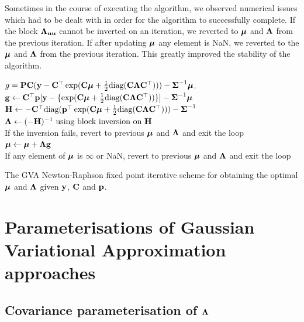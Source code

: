 Sometimes in the course of  executing the algorithm, we observed numerical
issues which had to be dealt with in order for the algorithm to successfully
complete. If the block ${\boldsymbol \Lambda}_{{\bf u} {\bf u}}$ cannot be inverted on an iteration,
we reverted to ${\boldsymbol \mu}$ and ${\boldsymbol \Lambda}$ from the previous iteration. If after
updating ${\boldsymbol \mu}$ any element is NaN, we reverted to the ${\boldsymbol \mu}$ and ${\boldsymbol \Lambda}$
from the previous iteration. This greatly improved the stability of the
algorithm.

\begin{algorithm}
	\begin{algorithmic}
		\REQUIRE $g = {\bf P} {\bf C} ({\bf y} - {\bf C}^\top \exp({\bf C} {\boldsymbol \mu} + \tfrac{1}{2} \text{diag}{({\bf C}{\boldsymbol\Lambda}{\bf C}^\top)})) - {\boldsymbol \Sigma}^{-1} {\boldsymbol \mu}$.
			\STATE ${\bf g} \leftarrow {\bf C}^\top {\bf p} [{\bf y} - \{ \exp({\bf C} {\boldsymbol \mu} + \tfrac{1}{2} \text{diag}({\bf C} {\boldsymbol \Lambda} {\bf C}^\top)) \}] - {\boldsymbol \Sigma}^{-1} {\boldsymbol \mu}$ \\
			\STATE ${\bf H} \leftarrow -{\bf C}^\top \text{diag}({\bf p}^\top \exp({\bf C} {\boldsymbol \mu} + \tfrac{1}{2} \text{diag}({\bf C} {\boldsymbol \Lambda} {\bf C}^\top))) - {\boldsymbol \Sigma}^{-1}$ \\
			\STATE ${\boldsymbol \Lambda} \leftarrow (-{\bf H})^{-1} \text{ using block inversion on } {\bf H}$ \\
			If the inversion fails, revert to previous ${\boldsymbol \mu}$ and ${\boldsymbol \Lambda}$ and exit the loop \\
			\STATE ${\boldsymbol \mu} \leftarrow {\boldsymbol\mu} + {\boldsymbol \Lambda} {\bf g}$ \\
			If any element of ${\boldsymbol \mu}$ is $\infty$ or NaN, revert to previous ${\boldsymbol \mu}$ and ${\boldsymbol \Lambda}$ and exit the loop
		\ENDWHILE
	\end{algorithmic}
	\caption{The GVA Newton-Raphson fixed point iterative scheme for obtaining the optimal ${\boldsymbol \mu}$ and ${\boldsymbol \Lambda}$
		given ${\bf y}$, ${\bf C}$ and ${\bf p}$.}
	\label{alg:algorithm_nr}
\end{algorithm}
		
		
\section{Parameterisations of Gaussian Variational Approximation approaches}
\label{sec:param}
\subsection{Covariance parameterisation of ${\boldsymbol \Lambda}$}

